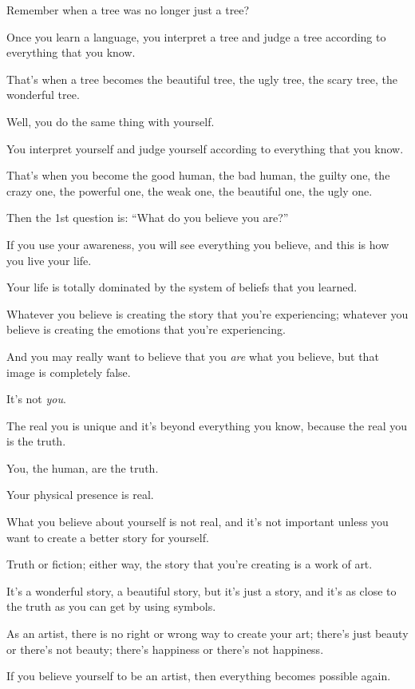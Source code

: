 \documentclass{article}
\numberwithin{equation}{section}
\begin{document}
Remember when a tree was no longer just a tree?

Once you learn a language, you interpret a tree and judge a tree according to everything that you know.

That's when a tree becomes the beautiful tree, the ugly tree, the scary tree, the wonderful tree.

Well, you do the same thing with yourself.

You interpret yourself and judge yourself according to everything that you know.

That's when you become the good human, the bad human, the guilty one, the crazy one, the powerful one, the weak one, the beautiful one, the ugly one.


Then the 1st question is: ``What do you believe you are?''

%
If you use your awareness, you will see everything you believe, and this is how you live your life.

Your life is totally dominated by the system of beliefs that you learned.

Whatever you believe is creating the story that you're experiencing; whatever you believe is creating the emotions that you're experiencing.

And you may really want to believe that you \textit{are} what you believe, but that image is completely false.

It's not \textit{you}.

%
The real you is unique and it's beyond everything you know, because the real you is the truth.

You, the human, are the truth.

Your physical presence is real.

What you believe about yourself is not real, and it's not important unless you want to create a better story for yourself.

Truth or fiction; either way, the story that you're creating is a work of art.

It's a wonderful story, a beautiful story, but it's just a story, and it's as close to the truth as you can get by using symbols.

As an artist, there is no right or wrong way to create your art; there's just beauty or there's not beauty; there's happiness or there's not happiness.

If you believe yourself to be an artist, then everything becomes possible again.
\end{document}
